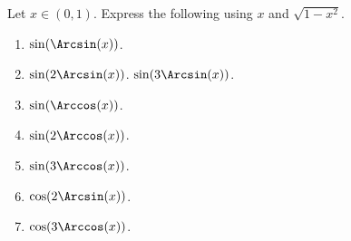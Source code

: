 Let $x\in (0,1)$. Express the following using $x$ and $\sqrt{1-x^2}$.  
\begin{multicols}{2}
\begin{enumerate}
\item $\sin(\Arcsin (x))$. 
\item $\sin(2\Arcsin (x))$. 
 $\sin(3\Arcsin (x))$. 
\item $\sin(\Arccos (x))$. 
\item $\sin(2\Arccos (x))$. 
\item $\sin(3\Arccos (x))$. 
\item $\cos(2\Arcsin (x))$. 
\item $\cos(3\Arccos (x))$. 
\end{enumerate}
\end{multicols}
